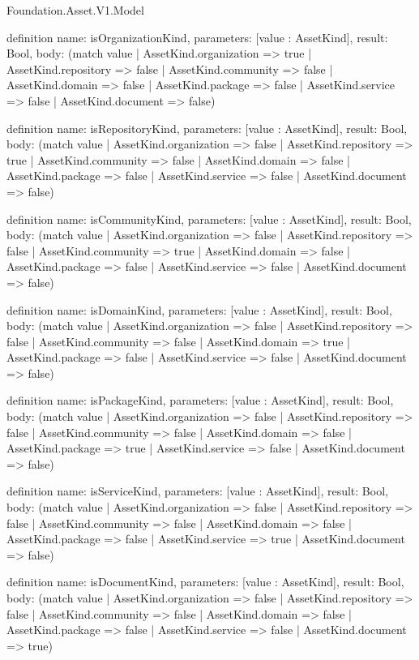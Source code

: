 \begin{lexlean}{Foundation.Asset.V1.Model}
\begin{semanticmodule}
definition{
  name: isOrganizationKind,
  parameters: [value : AssetKind],
  result: Bool,
  body: (match value
    | AssetKind.organization => true
    | AssetKind.repository => false
    | AssetKind.community => false
    | AssetKind.domain => false
    | AssetKind.package => false
    | AssetKind.service => false
    | AssetKind.document => false)
}

definition{
  name: isRepositoryKind,
  parameters: [value : AssetKind],
  result: Bool,
  body: (match value
    | AssetKind.organization => false
    | AssetKind.repository => true
    | AssetKind.community => false
    | AssetKind.domain => false
    | AssetKind.package => false
    | AssetKind.service => false
    | AssetKind.document => false)
}

definition{
  name: isCommunityKind,
  parameters: [value : AssetKind],
  result: Bool,
  body: (match value
    | AssetKind.organization => false
    | AssetKind.repository => false
    | AssetKind.community => true
    | AssetKind.domain => false
    | AssetKind.package => false
    | AssetKind.service => false
    | AssetKind.document => false)
}

definition{
  name: isDomainKind,
  parameters: [value : AssetKind],
  result: Bool,
  body: (match value
    | AssetKind.organization => false
    | AssetKind.repository => false
    | AssetKind.community => false
    | AssetKind.domain => true
    | AssetKind.package => false
    | AssetKind.service => false
    | AssetKind.document => false)
}

definition{
  name: isPackageKind,
  parameters: [value : AssetKind],
  result: Bool,
  body: (match value
    | AssetKind.organization => false
    | AssetKind.repository => false
    | AssetKind.community => false
    | AssetKind.domain => false
    | AssetKind.package => true
    | AssetKind.service => false
    | AssetKind.document => false)
}

definition{
  name: isServiceKind,
  parameters: [value : AssetKind],
  result: Bool,
  body: (match value
    | AssetKind.organization => false
    | AssetKind.repository => false
    | AssetKind.community => false
    | AssetKind.domain => false
    | AssetKind.package => false
    | AssetKind.service => true
    | AssetKind.document => false)
}

definition{
  name: isDocumentKind,
  parameters: [value : AssetKind],
  result: Bool,
  body: (match value
    | AssetKind.organization => false
    | AssetKind.repository => false
    | AssetKind.community => false
    | AssetKind.domain => false
    | AssetKind.package => false
    | AssetKind.service => false
    | AssetKind.document => true)
}


\end{semanticmodule}
\end{lexlean}
